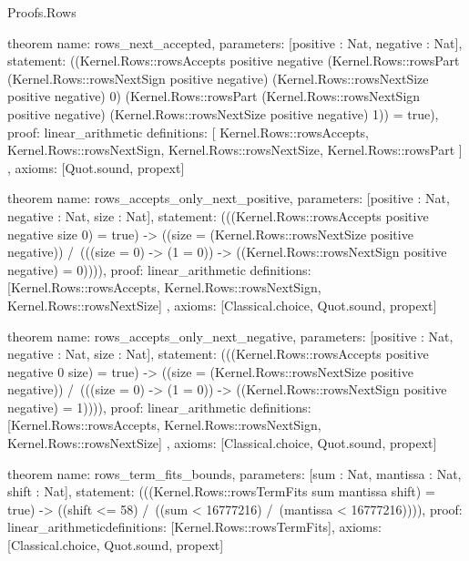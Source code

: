 \begin{lexlean}{Proofs.Rows}
\begin{semanticmodule}
theorem{
  name: rows_next_accepted,
  parameters: [positive : Nat, negative : Nat],
  statement: ((Kernel.Rows::rowsAccepts positive negative (Kernel.Rows::rowsPart (Kernel.Rows::rowsNextSign positive negative) (Kernel.Rows::rowsNextSize positive negative) 0) (Kernel.Rows::rowsPart (Kernel.Rows::rowsNextSign positive negative) (Kernel.Rows::rowsNextSize positive negative) 1)) = true),
  proof: linear_arithmetic{
    definitions: [
      Kernel.Rows::rowsAccepts,
      Kernel.Rows::rowsNextSign,
      Kernel.Rows::rowsNextSize,
      Kernel.Rows::rowsPart
    ]
  },
  axioms: [Quot.sound, propext]
}

theorem{
  name: rows_accepts_only_next_positive,
  parameters: [positive : Nat, negative : Nat, size : Nat],
  statement: (((Kernel.Rows::rowsAccepts positive negative size 0) = true) -> ((size = (Kernel.Rows::rowsNextSize positive negative)) /\ (((size = 0) -> (1 = 0)) -> ((Kernel.Rows::rowsNextSign positive negative) = 0)))),
  proof: linear_arithmetic{
    definitions: [Kernel.Rows::rowsAccepts, Kernel.Rows::rowsNextSign, Kernel.Rows::rowsNextSize]
  },
  axioms: [Classical.choice, Quot.sound, propext]
}

theorem{
  name: rows_accepts_only_next_negative,
  parameters: [positive : Nat, negative : Nat, size : Nat],
  statement: (((Kernel.Rows::rowsAccepts positive negative 0 size) = true) -> ((size = (Kernel.Rows::rowsNextSize positive negative)) /\ (((size = 0) -> (1 = 0)) -> ((Kernel.Rows::rowsNextSign positive negative) = 1)))),
  proof: linear_arithmetic{
    definitions: [Kernel.Rows::rowsAccepts, Kernel.Rows::rowsNextSign, Kernel.Rows::rowsNextSize]
  },
  axioms: [Classical.choice, Quot.sound, propext]
}

theorem{
  name: rows_term_fits_bounds,
  parameters: [sum : Nat, mantissa : Nat, shift : Nat],
  statement: (((Kernel.Rows::rowsTermFits sum mantissa shift) = true) -> ((shift <= 58) /\ ((sum < 16777216) /\ (mantissa < 16777216)))),
  proof: linear_arithmetic{definitions: [Kernel.Rows::rowsTermFits]},
  axioms: [Classical.choice, Quot.sound, propext]
}
\end{semanticmodule}
\end{lexlean}
